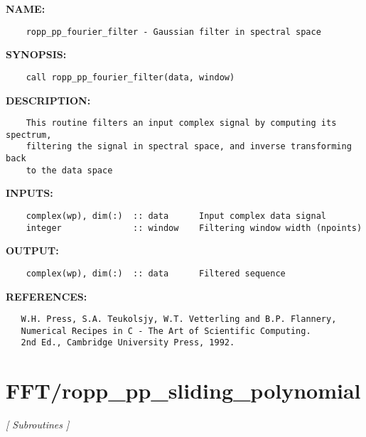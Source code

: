 \label{ch:robo16}
\label{ch:FFT_ropp_pp_fourier_filter}
\textbf{NAME:}\hspace{0.08in}\begin{Verbatim}
    ropp_pp_fourier_filter - Gaussian filter in spectral space
\end{Verbatim}
\textbf{SYNOPSIS:}\hspace{0.08in}\begin{Verbatim}
    call ropp_pp_fourier_filter(data, window)
\end{Verbatim}
\textbf{DESCRIPTION:}\hspace{0.08in}\begin{Verbatim}
    This routine filters an input complex signal by computing its spectrum,
    filtering the signal in spectral space, and inverse transforming back
    to the data space
\end{Verbatim}
\textbf{INPUTS:}\hspace{0.08in}\begin{Verbatim}
    complex(wp), dim(:)  :: data      Input complex data signal
    integer              :: window    Filtering window width (npoints)
\end{Verbatim}
\textbf{OUTPUT:}\hspace{0.08in}\begin{Verbatim}
    complex(wp), dim(:)  :: data      Filtered sequence
\end{Verbatim}
\textbf{REFERENCES:}\hspace{0.08in}\begin{Verbatim}
   W.H. Press, S.A. Teukolsjy, W.T. Vetterling and B.P. Flannery,
   Numerical Recipes in C - The Art of Scientific Computing.
   2nd Ed., Cambridge University Press, 1992.
\end{Verbatim}
\section{FFT/ropp\_pp\_sliding\_polynomial}
\textsl{[ Subroutines ]}

